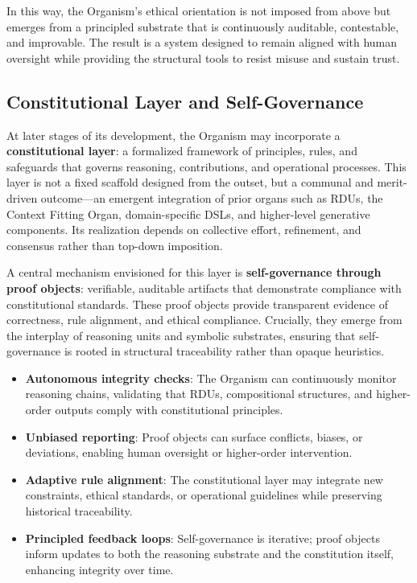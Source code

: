 \documentclass[12pt]{article}
\begin{document}
In this way, the Organism’s ethical orientation is not imposed from above but emerges from a principled substrate that is continuously auditable, contestable, and improvable. The result is a system designed to remain aligned with human oversight while providing the structural tools to resist misuse and sustain trust.  

\subsection{Constitutional Layer and Self-Governance}

At later stages of its development, the Organism may incorporate a \textbf{constitutional layer}: a formalized framework of principles, rules, and safeguards that governs reasoning, contributions, and operational processes. This layer is not a fixed scaffold designed from the outset, but a communal and merit-driven outcome—an emergent integration of prior organs such as RDUs, the Context Fitting Organ, domain-specific DSLs, and higher-level generative components. Its realization depends on collective effort, refinement, and consensus rather than top-down imposition.  

A central mechanism envisioned for this layer is \textbf{self-governance through proof objects}: verifiable, auditable artifacts that demonstrate compliance with constitutional standards. These proof objects provide transparent evidence of correctness, rule alignment, and ethical compliance. Crucially, they emerge from the interplay of reasoning units and symbolic substrates, ensuring that self-governance is rooted in structural traceability rather than opaque heuristics.  

\begin{itemize}
    \item \textbf{Autonomous integrity checks}: The Organism can continuously monitor reasoning chains, validating that RDUs, compositional structures, and higher-order outputs comply with constitutional principles.  
    \item \textbf{Unbiased reporting}: Proof objects can surface conflicts, biases, or deviations, enabling human oversight or higher-order intervention.  
    \item \textbf{Adaptive rule alignment}: The constitutional layer may integrate new constraints, ethical standards, or operational guidelines while preserving historical traceability.  
    \item \textbf{Principled feedback loops}: Self-governance is iterative; proof objects inform updates to both the reasoning substrate and the constitution itself, enhancing integrity over time.  
\end{itemize}
\end{document}
